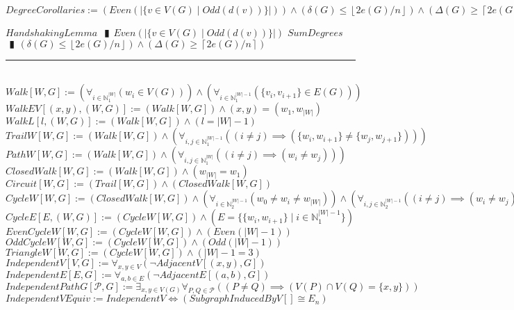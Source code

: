 \documentclass{book}
\newcommand{\abr}{:=}
\newcommand{\pipe}{$\phantom{(}\vrectangleblack\phantom{)}$}
\newcommand{\st}{\mathbin{|}}
\newcommand{\utup}[1]{\{#1\}}
\newcommand{\floor}[1]{\left\lfloor #1 \right\rfloor}
\newcommand{\ceil}[1]{\left\lceil #1 \right\rceil}
\begin{document}
$DegreeCorollaries \abr (Even(|\{v \in V(G) \st Odd(d(v))\}|)) \land (\delta(G) \leq \floor{2 e(G) / n}) \land (\Delta(G) \geq \ceil{2 e(G) / n})$
\begin{enumerate}
  \lit $HandshakingLemma$ \pipe $Even(|\{v \in V(G) \st Odd(d(v))\}|)$
  \lit $SumDegrees$ \pipe $(\delta(G) \leq \floor{2 e(G) / n}) \land (\Delta(G) \geq \ceil{2 e(G) / n})$
\end{enumerate} \vspace{.75mm} \hrule \vspace{.75mm} \ \\ 

$Walk[W, G] \abr (\forall_{i \in \mathbb{N}_1^{|W|}}(w_i \in V(G))) \land (\forall_{i \in \mathbb{N}_1^{|W| - 1}}(\utup{v_i, v_{i + 1}} \in E(G)))$ \\
$WalkEV[(x, y), (W, G)] \abr (Walk[W, G]) \land (x, y) = (w_1, w_{|W|})$ \\
$WalkL[l, (W, G)] \abr (Walk[W, G]) \land (l = |W| - 1)$ \\
$TrailW[W, G] \abr (Walk[W, G]) \land (\forall_{i, j \in \mathbb{N}_1^{|W| - 1}}((i \neq j) \implies (\utup{w_i, w_{i + 1}} \neq \utup{w_j, w_{j + 1}})))$ \\
$PathW[W, G] \abr (Walk[W, G]) \land (\forall_{i, j \in \mathbb{N}_1^{|W|}}((i \neq j) \implies (w_i \neq w_j)))$ \\

$ClosedWalk[W, G] \abr (Walk[W, G]) \land (w_{|W|} = w_1)$ \\
$Circuit[W, G] \abr (Trail[W, G]) \land (ClosedWalk[W, G])$ \\
$CycleW[W, G] \abr (ClosedWalk[W, G]) \land (\forall_{i \in \mathbb{N}_2^{|W| - 1}}(w_0 \neq w_i \neq w_{|W|})) \land (\forall_{i, j \in \mathbb{N}_2^{|W| - 1}}((i \neq j) \implies (w_i \neq w_j))) \land (|W| - 1 \geq 3)$ \\
$CycleE[E, (W, G)] \abr (CycleW[W, G]) \land (E = \{\utup{w_i, w_{i + 1}} \st i \in \mathbb{N}_1^{|W| - 1}\})$ \\
$EvenCycleW[W, G] \abr (CycleW[W, G]) \land (Even(|W| - 1))$ \\
$OddCycleW[W, G] \abr (CycleW[W, G]) \land (Odd(|W| - 1))$ \\
$TriangleW[W, G] \abr (CycleW[W, G]) \land (|W| - 1 = 3)$ \\

$IndependentV[V, G] \abr \forall_{x, y \in V}(\lnot AdjacentV[(x, y), G])$ \\
$IndependentE[E, G] \abr \forall_{a, b \in E}(\lnot AdjacentE[(a, b), G])$ \\
$IndependentPathG[\mathcal{P}, G] \abr \exists_{x, y \in V(G)} \forall_{P, Q \in \mathcal{P}}((P \neq Q) \implies (V(P) \cap V(Q) = \utup{x, y}))$ \\
$IndependentVEquiv \abr IndependentV \iff (SubgraphInducedByV[] \cong E_n)$ \\
\end{document}
